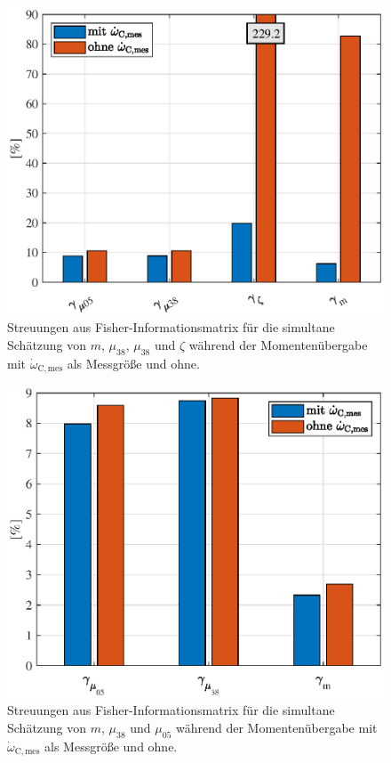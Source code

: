 \begin{figure}[ht]
  \centering
 \includegraphics[scale=0.9]{figures/03_Sensitivitaetsanalyse/03_Fisher_Info/Muebergabe/m_mu38_mue05_zeta.eps}
  \caption{Streuungen aus Fisher-Informationsmatrix für die simultane Schätzung von $m$, $\mu_{38}$, $\mu_{38}$ und $\zeta$ während der Momentenübergabe mit $\dot{\omega}_\mathrm{C,mes}$ als Messgröße und ohne.}\label{fig:MÜ_m_mu38_mue05_zeta}
\end{figure} 

\begin{figure}[ht]
  \centering
 \includegraphics[scale=0.9]{figures/03_Sensitivitaetsanalyse/03_Fisher_Info/Muebergabe/m_mu38_mue05.eps}
  \caption{Streuungen aus Fisher-Informationsmatrix für die simultane Schätzung von $m$, $\mu_{38}$ und $\mu_{05}$ während der Momentenübergabe mit $\dot{\omega}_\mathrm{C,mes}$ als Messgröße und ohne.}\label{fig:MÜ_m_mu_sim}
\end{figure} 

